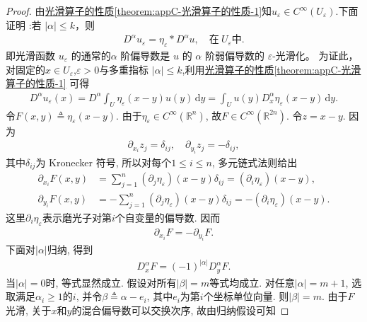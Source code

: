 \documentclass[../../main.tex]{subfiles}
\begin{document}
\begin{proof}

由\hyperref[theorem:appC-光滑算子的性质]{光滑算子的性质\ref{theorem:appC-光滑算子的性质-1}}知$u_{\varepsilon}\in C^{\infty}(U_{\varepsilon})$.下面证明 :若 $|\alpha|\leqslant k$，则
\begin{align}
D^{\alpha}u_{\varepsilon}=\eta_{\varepsilon}*D^{\alpha}u,\quad\text{在}\ U_{\varepsilon}\text{中}.
\label{align:ch05-磨光导数}
\end{align}
即光滑函数 $u_{\varepsilon}$ 的通常的$\alpha$ 阶偏导数是 $u$ 的 $\alpha$ 阶弱偏导数的 $\varepsilon$-光滑化。
为证此，对固定的$x\in U_{\varepsilon}$,$\varepsilon>0$与多重指标 \(|\alpha|\leqslant k\),利用\hyperref[theorem:appC-光滑算子的性质-1]{光滑算子的性质\ref{theorem:appC-光滑算子的性质-1}}
可得
\begin{align}\label{eq::jifjiojiwjiIOJ9200--392022-1}
D^{\alpha}u_{\varepsilon}\left( x \right) = D^{\alpha}\int_U{\eta _{\varepsilon}\left( x-y \right) u\left( y \right) \,\mathrm{d}y}=\int_U{u\left( y \right) D_{x}^{\alpha}\eta _{\varepsilon}\left( x-y \right) \,\mathrm{d}y}.
\end{align}
令$F(x,y)\triangleq\eta_\varepsilon(x-y)$. 由于$\eta_\varepsilon\in C^\infty(\mathbb{R}^n)$, 故$F\in C^\infty(\mathbb{R}^{2n})$.
令$z=x-y$. 因为
\begin{align*}
\partial_{x_i}z_j=\delta_{ij},\quad\partial_{y_i}z_j=-\delta_{ij},
\end{align*}
其中$\delta_{ij}$为 Kronecker 符号, 所以对每个$1\leqslant i\leqslant n$, 多元链式法则给出
\begin{align*}
\partial_{x_i}F(x,y)
&=\sum\limits_{j=1}^{n}(\partial_j\eta_\varepsilon)(x-y)\delta_{ij}
=(\partial_i\eta_\varepsilon)(x-y),\\
\partial_{y_i}F(x,y)
&=-\sum\limits_{j=1}^{n}(\partial_j\eta_\varepsilon)(x-y)\delta_{ij}
=-(\partial_i\eta_\varepsilon)(x-y).
\end{align*}
这里$\partial_i\eta_\varepsilon$表示磨光子对第$i$个自变量的偏导数. 因而
\begin{align*}
\partial_{x_i}F=-\partial_{y_i}F.
\end{align*}
下面对$|\alpha|$归纳, 得到
\begin{align*}
D_x^\alpha F=(-1)^{|\alpha|}D_y^\alpha F.
\end{align*}
当$|\alpha|=0$时, 等式显然成立. 假设对所有$|\beta|=m$等式均成立. 对任意$|\alpha|=m+1$, 选取满足$\alpha_i\geqslant1$的$i$, 并令$\beta\triangleq\alpha-e_i$, 其中$e_i$为第$i$个坐标单位向量. 则$|\beta|=m$. 由于$F$光滑, 关于$x$和$y$的混合偏导数可以交换次序, 故由归纳假设可知

\end{proof}
\end{document}

